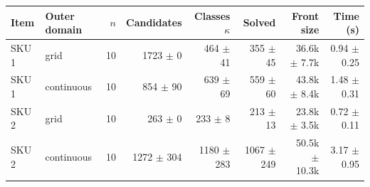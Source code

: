 \begin{tabular}{@{}llrrrrrr@{}}
\toprule
Item & Outer domain & $n$ & Candidates & Classes $\kappa$ & Solved & Front size & Time (s) \\
\midrule
SKU 1 & grid & 10 & 1723 $\pm$ 0 & 464 $\pm$ 41 & 355 $\pm$ 45 & 36.6k $\pm$ 7.7k & 0.94 $\pm$ 0.25 \\
SKU 1 & continuous & 10 & 854 $\pm$ 90 & 639 $\pm$ 69 & 559 $\pm$ 60 & 43.8k $\pm$ 8.4k & 1.48 $\pm$ 0.31 \\
SKU 2 & grid & 10 & 263 $\pm$ 0 & 233 $\pm$ 8 & 213 $\pm$ 13 & 23.8k $\pm$ 3.5k & 0.72 $\pm$ 0.11 \\
SKU 2 & continuous & 10 & 1272 $\pm$ 304 & 1180 $\pm$ 283 & 1067 $\pm$ 249 & 50.5k $\pm$ 10.3k & 3.17 $\pm$ 0.95 \\
\bottomrule
\end{tabular}
